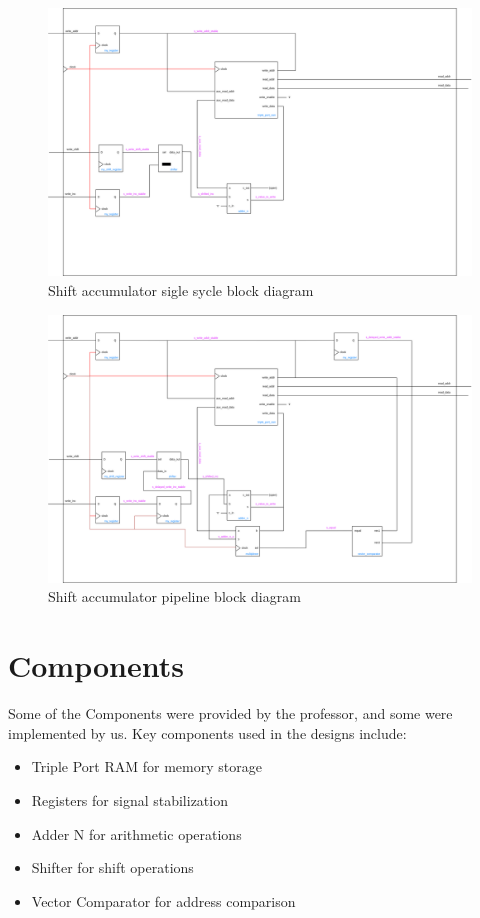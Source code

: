 \documentclass[a4paper,12pt]{article}
\begin{document}
\begin{figure}[H]
    \centering
    \includegraphics[width=1.0\linewidth]{accumulator_shift_single_sycle.png}
    \caption{Shift accumulator sigle sycle block diagram}
    \label{fig:shift}
\end{figure}

\begin{figure}[H]
    \centering
    \includegraphics[width=1.0\linewidth]{accumulator_shift_pipeline.png}
    \caption{Shift accumulator pipeline block diagram}
    \label{fig:shift_pipeline}
\end{figure}


\section{Components}
Some of the Components were provided by the professor, and some were 
implemented by us.
Key components used in the designs include:
\begin{itemize}
    \item Triple Port RAM for memory storage
    \item Registers for signal stabilization
    \item Adder N for arithmetic operations
    \item Shifter for shift operations
    \item Vector Comparator for address comparison
\end{itemize}
\end{document}
